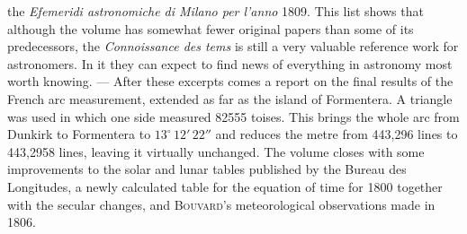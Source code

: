 the \emph{Efemeridi astronomiche di Milano per l'anno} 1809. This list shows that although the volume has somewhat fewer original papers than some of its predecessors, the \emph{Connoissance des tems} is still a very valuable reference work for astronomers. In it they can expect to find news of everything in astronomy most worth knowing. — After these excerpts comes a report on the final results of the French arc measurement, extended as far as the island of Formentera. A triangle was used in which one side measured 82555 toises. This brings the whole arc from Dunkirk to Formentera to $13^\circ\,12'\,22''$ and reduces the metre from 443,296 lines to 443,2958 lines, leaving it virtually unchanged. The volume closes with some improvements to the solar and lunar tables published by the Bureau des Longitudes, a newly calculated table for the equation of time for 1800 together with the secular changes, and \textsc{Bouvard}’s meteorological observations made in 1806.
